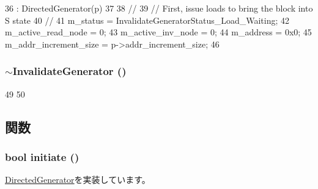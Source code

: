 \begin{DoxyCode}
36     : DirectedGenerator(p)
37 {
38     //
39     // First, issue loads to bring the block into S state
40     //
41     m_status = InvalidateGeneratorStatus_Load_Waiting;
42     m_active_read_node = 0;
43     m_active_inv_node = 0;
44     m_address = 0x0;
45     m_addr_increment_size = p->addr_increment_size;
46 }
\end{DoxyCode}
\hypertarget{classInvalidateGenerator_ab35dfa6480e5b8341f6d117e8153f398}{
\subsubsection[{$\sim$InvalidateGenerator}]{\setlength{\rightskip}{0pt plus 5cm}$\sim${\bf InvalidateGenerator} ()}}
\label{classInvalidateGenerator_ab35dfa6480e5b8341f6d117e8153f398}



\begin{DoxyCode}
49 {
50 }
\end{DoxyCode}


\subsection{関数}
\hypertarget{classInvalidateGenerator_a4f5ee6a9e0c2962dfc0b4bb1978e6d28}{
\subsubsection[{initiate}]{\setlength{\rightskip}{0pt plus 5cm}bool initiate ()}}
\label{classInvalidateGenerator_a4f5ee6a9e0c2962dfc0b4bb1978e6d28}


\hyperlink{classDirectedGenerator_a1c6f0032904b7bd7035a5cb7c88a8354}{DirectedGenerator}を実装しています。


